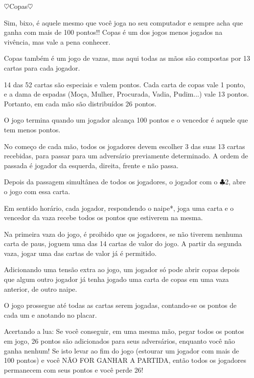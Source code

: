 \begin{subsecao}{$\heartsuit$Copas$\heartsuit$} 

Sim, bixo, é aquele mesmo que você joga no seu computador e sempre acha que
ganha com mais de 100 pontos!! Copas é um dos jogos menos jogados na vivência,
mas vale a pena conhecer. 

Copas também é um jogo de vazas, mas aqui todas as mãos são compostas por 13
cartas para cada jogador. 

14 das 52 cartas são especiais e valem pontos. Cada carta de copas vale 1
ponto, e a dama de espadas (Moça, Mulher, Procurada, Vadia, Pudim...) vale 13
pontos. Portanto, em cada mão são distribuídos 26 pontos. 

O jogo termina quando um jogador alcança 100 pontos e o vencedor é aquele que
tem menos pontos. 

No começo de cada mão, todos os jogadores devem escolher 3 das suas 13 cartas
recebidas, para passar para um adversário previamente determinado. A ordem de
passada é jogador da esquerda, direita, frente e não passa.

Depois da passagem simultânea de todos os jogadores, o jogador com
o $\clubsuit$2, abre o jogo com essa carta.

Em sentido horário, cada jogador, respondendo o naipe*, joga uma carta e o
vencedor da vaza recebe todos os pontos que estiverem na mesma.

Na primeira vaza do jogo, é proibido que os jogadores, se não tiverem nenhuma
carta de paus, joguem uma das 14 cartas de valor do jogo. A partir da segunda
vaza, jogar uma das cartas de valor já é permitido.

Adicionando uma tensão extra ao jogo, um jogador só pode abrir copas depois que
algum outro jogador já tenha jogado uma carta de copas em uma vaza anterior, de
outro naipe.

O jogo prossegue até todas as cartas serem jogadas, contando-se os pontos de
cada um e anotando no placar. 

Acertando a lua: Se você conseguir, em uma mesma mão, pegar todos os pontos em
jogo, 26 pontos são adicionados para seus adversários, enquanto você não ganha
nenhum! Se isto levar ao fim do jogo (estourar um jogador com mais de 100
pontos) e você NÃO FOR GANHAR A PARTIDA, então todos os jogadores permanecem
com seus pontos e você perde 26! 

\end{subsecao}
